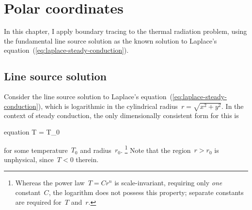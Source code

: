\chapter{Polar coordinates}
\label{ch:polar}

In this chapter, I apply boundary tracing to the thermal radiation problem,
using the fundamental line source solution
as the known solution to
Laplace's equation~(\ref{eq:laplace-steady-conduction}).

\section{Line source solution}
\label{sec:polar.line}

Consider the line source solution
to Laplace's equation~(\ref{eq:laplace-steady-conduction}),
which is logarithmic in the cylindrical radius~$r = \sqrt{x^2 + y^2}$.
In the context of steady conduction,
the only dimensionally consistent form for this is
\begin{important}{equation}
  T = T_0 \log {}
  \label{eq:line-laplace-solution}
\end{important}
for some temperature~$T_0$ and radius~$r_0$.%
\footnote{
  Whereas the power law~$T = C r^n$ is scale-invariant,
  requiring only \emph{one} constant~$C$,
  the logarithm does not possess this property;
  separate constants are required for~$T$ and~$r$.
}
Note that the region~$r > r_0$ is unphysical,
since~$T < 0$ therein.

